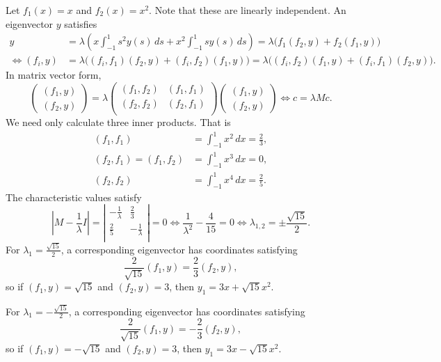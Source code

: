 \documentclass{homework}
\begin{document}
\begin{solution}
  Let $f_1(x) = x$ and $f_2(x) = x^2$.  Note that these are linearly independent. An eigenvector $y$ satisfies
\begin{align*}
    y &= \lambda \left(x\int_{-1}^1 s^2y(s) \,ds + x^2 \int_{-1}^1 sy(s)\,ds\right) = \lambda \big( f_1 (f_2,y) + f_2 (f_1,y)\big)\\
\iff(f_i,y) &= \lambda\big( (f_i,f_1) (f_2,y) + (f_i,f_2) (f_1,y)\big)= \lambda\big( (f_i,f_2) (f_1,y) + (f_i,f_1) (f_2,y)\big).
\end{align*}
In matrix vector form,
$$
  \begin{pmatrix}
    (f_1,y)\\
    (f_2,y)
  \end{pmatrix}
   = \lambda \begin{pmatrix}
  (f_1,f_2) & (f_1,f_1) \\
  (f_2,f_2) & (f_2,f_1) \\
  \end{pmatrix} 
  \begin{pmatrix}
    (f_1,y)\\
    (f_2,y)
  \end{pmatrix}
  \iff
  c = \lambda M c.
$$
We need only calculate three inner products.  That is
\begin{align*}
  (f_1,f_1) &= \int_{-1}^1 x^2\,dx = \frac 23,\\
  (f_2,f_1) = (f_1,f_2) &= \int_{-1}^1 x^3\,dx = 0,\\
  (f_2,f_2) &= \int_{-1}^1 x^4\,dx = \frac 25.
\end{align*}
The characteristic values satisfy
$$
\renewcommand{\arraystretch}{2}
  \left|M - \frac 1\lambda I\right| 
  = \left|\begin{array}{ccc}
    -\frac 1\lambda & \frac 23 \\
    \frac 25 & -\frac 1\lambda \\
  \end{array}
  \right|
  = 0 \iff \frac 1{\lambda^2} - \frac 4{15} = 0 \iff \lambda_{1,2} = \pm \frac{\sqrt{15}}2.
$$
For $\lambda_1 = \frac{\sqrt{15}}2$, a corresponding eigenvector has coordinates satisfying
$$
  \frac{2}{\sqrt{15}}(f_1,y) = \frac 23 (f_2,y),
$$
so if $(f_1,y) = \sqrt{15}$ and $(f_2,y) = 3$, then $y_1 = 3x + \sqrt{15} x^2$.

For $\lambda_1 = -\frac{\sqrt{15}}2$, a corresponding eigenvector has coordinates satisfying
$$
  \frac{2}{\sqrt{15}}(f_1,y) = -\frac 23 (f_2,y),
$$
so if $(f_1,y) = -\sqrt{15}$ and $(f_2,y) = 3$, then $y_1 = 3x - \sqrt{15} x^2$.

\end{solution}
\end{document}
